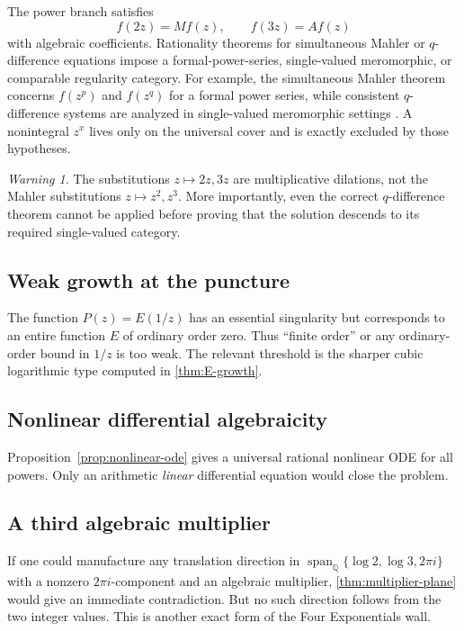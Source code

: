 \documentclass[11pt,oneside]{article}
\theoremstyle{definition}
\theoremstyle{remark}
\newtheorem{warning}[theorem]{Warning}
\newcommand{\Q}{\mathbb Q}
\newcommand{\Span}{\operatorname{span}}
\begin{document}
The power branch satisfies
\[
  f(2z)=Mf(z),\qquad f(3z)=Af(z)
\]
with algebraic coefficients.  Rationality theorems for simultaneous Mahler or \(q\)-difference equations impose a formal-power-series, single-valued meromorphic, or comparable regularity category.  For example, the simultaneous Mahler theorem concerns \(f(z^p)\) and \(f(z^q)\) for a formal power series, while consistent \(q\)-difference systems are analyzed in single-valued meromorphic settings \cite{SchaefkeSinger2019,SchaefkeSingerMahler2017,Jolly2002}.  A nonintegral \(z^x\) lives only on the universal cover and is exactly excluded by those hypotheses.

\begin{warning}
The substitutions \(z\mapsto2z,3z\) are multiplicative dilations, not the Mahler substitutions \(z\mapsto z^2,z^3\).  More importantly, even the correct \(q\)-difference theorem cannot be applied before proving that the solution descends to its required single-valued category.
\end{warning}

\subsection{Weak growth at the puncture}

The function \(P(z)=E(1/z)\) has an essential singularity but corresponds to an entire function \(E\) of ordinary order zero.  Thus ``finite order'' or any ordinary-order bound in \(1/z\) is too weak.  The relevant threshold is the sharper cubic logarithmic type computed in \cref{thm:E-growth}.

\subsection{Nonlinear differential algebraicity}

Proposition~\ref{prop:nonlinear-ode} gives a universal rational nonlinear ODE for all powers.  Only an arithmetic \emph{linear} differential equation would close the problem.

\subsection{A third algebraic multiplier}

If one could manufacture any translation direction in
\(\Span_\Q\{\log2,\log3,2\pi i\}\) with a nonzero \(2\pi i\)-component and an algebraic multiplier, \cref{thm:multiplier-plane} would give an immediate contradiction.  But no such direction follows from the two integer values.  This is another exact form of the Four Exponentials wall.
\end{document}
